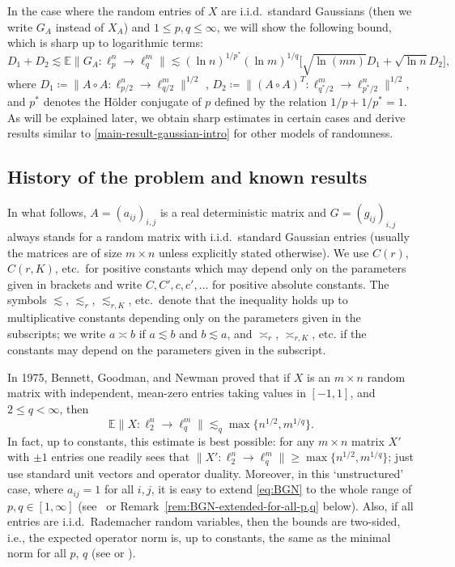\documentclass[a4paper]{amsart}
\theoremstyle{definition}
\theoremstyle{remark}
\numberwithin{equation}{section}
\newcommand*{\EE}{\mathbb{E}}
\newcommand*{\hadprod}{\mathbin{\circ}} %
\begin{document}
In the case where the random entries of $X$ are i.i.d.~standard Gaussians (then we write $G_A$ instead of $X_A$) and $1\leq p,q \leq \infty$, we will show the following bound, which is sharp up to logarithmic terms:
  \begin{equation}\label{main-result-gaussian-intro}
 D_1 + D_2 \lesssim \EE \|G_A \colon \ell^n_p\to \ell^m_q\|
  \lesssim  (\ln n)^{1/p^*}  (\ln m)^{1/q} \bigl[  \sqrt{\ln(mn)} D_1
  +\sqrt{\ln n} D_2\bigr],
  \end{equation}
  where $D_1  \coloneqq \|A\hadprod A \colon \ell^n_{p/2} \to \ell^m_{q/2}\|^{1/2}$ , $D_2  \coloneqq \|(A\hadprod A)^T \colon \ell^m_{q^*/2} \to \ell^n_{p^*/2}\|^{1/2}$, and $p^*$ denotes the H\"older conjugate of $p$ defined by the relation $1/p+1/p^*=1$.
 As will be explained later, we obtain sharp estimates in certain cases and derive results similar to \eqref{main-result-gaussian-intro} for other models of randomness.

%
\subsection{History of the problem and known results}\label{sec:known-results}
%

In what follows, $A = (a_{ij})_{i,j}$ is a real deterministic matrix and $G=(g_{ij})_{i,j}$ always stands for a random matrix with i.i.d.\ standard Gaussian entries (usually the matrices are of size $m\times n$ unless explicitly stated otherwise).
  We use $C(r)$, $C(r,K)$, etc.\ for positive constants which may depend only on the parameters given in brackets and write $C, C', c,c',\dots$ for positive absolute constants.
 The symbols $\lesssim$, $\lesssim_{r}$, $\lesssim_{r, K}$, etc.\ denote that the inequality holds up to multiplicative constants depending only on the parameters given in the subscripts;
we write $a\asymp b$ if $a\lesssim b$ and $b\lesssim a$, and $\asymp_r$, $\asymp_{r,K}$, etc. if the constants may depend on the parameters given in the subscript.


In 1975, Bennett, Goodman, and Newman \cite{BGN} proved that
 if $X$ is an $m\times n$ random matrix
with independent, mean-zero entries taking values in $[-1,1]$,
and $2\leq q < \infty$,
then
\begin{equation}
	\label{eq:BGN}
\EE \| X\colon \ell^n_2 \to \ell^m_q\| \lesssim_q \max\{n^{1/2}, m^{1/q}\}.
\end{equation}
In fact, up to constants, this estimate is best possible:
for any $m\times n$ matrix $X'$ with $\pm 1$ entries one readily sees that $ \| X'\colon \ell^n_2 \to \ell^m_q\| \geq \max\{n^{1/2}, m^{1/q}\}$; just use standard unit vectors and operator duality.
Moreover,
in this `unstructured' case, where $a_{ij}=1$ for all $i,j$,
it is easy to extend \eqref{eq:BGN} to the whole range of $p, q\in [1,\infty]$
(see~\cite{Bennett,CarlMaureyPuhl} or Remark~\ref{rem:BGN-extended-for-all-p,q} below). Also, if all entries are i.i.d.\ Rademacher random variables, then
the bounds are two-sided, i.e.,
the expected operator norm is, up to constants, the same as the minimal norm for all $p$, $q$
(see \cite[Proposition~3.2]{Bennett} or \cite[Satz~2]{CarlMaureyPuhl}).
\end{document}
